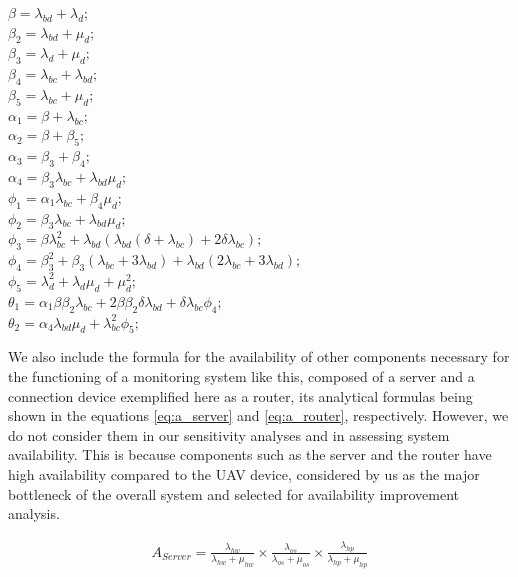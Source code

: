 \documentclass[conference]{IEEEtran}
\begin{document}
\begin{minipage}{.8\textwidth}%
\(\beta = \lambda_{bd} + \lambda_{d};\) \\
\(\beta_{2} = \lambda_{bd} + \mu_{d};\) \\
\(\beta_{3} = \lambda_{d} + \mu_{d};\) \\
\(\beta_{4} = \lambda_{bc} + \lambda_{bd};\) \\
\(\beta_{5} = \lambda_{bc} + \mu_{d};\) \\
\(\alpha_{1} = \beta + \lambda_{bc};\) \\
\(\alpha_{2} = \beta + \beta_{5};\) \\
\(\alpha_{3} = \beta_{3} + \beta_{4};\) \\
\(\alpha_{4} = \beta_{3}\lambda_{bc} + \lambda_{bd} \mu_{d};\) \\
\(\phi_{1} = \alpha_{1}\lambda_{bc} + \beta_{4} \mu_{d};\) \\
\(\phi_{2} = \beta_{3}\lambda_{bc} + \lambda_{bd} \mu_{d};\) \\
\(\phi_{3} = \beta \lambda_{bc}^{2} + \lambda_{bd} (\lambda_{bd} (\delta + \lambda_{bc}) + 2 \delta \lambda_{bc});\) \\
\(\phi_{4} = \beta_{3}^{2} + \beta_{3} (\lambda_{bc} + 3 \lambda_{bd}) + \lambda_{bd} (2 \lambda_{bc} + 3 \lambda_{bd});\) \\
\(\phi_{5} = \lambda_{d}^{2} + \lambda_{d} \mu_{d} + \mu_{d}^{2} ;\) \\
\(\theta_{1} = \alpha_{1} \beta  \beta_{2} \lambda_{bc} + 2 \beta  \beta_{2}  \delta \lambda_{bd}+ \delta  \lambda_{bc} \phi_{4};\) \\
\(\theta_{2} =  \alpha_{4} \lambda_{bd} \mu_{d} + \lambda_{bc}^{2} \phi_{5};\) \\
\end{minipage}%

We also include the formula for the availability of other components necessary for the functioning of a monitoring system like this, composed of a server and a connection device exemplified here as a router, its analytical formulas being shown in the equations \ref{eq:a_server} and \ref{eq:a_router}, respectively. However, we do not consider them in our sensitivity analyses and in assessing system availability. This is because components such as the server and the router have high availability compared to the UAV device, considered by us as the major bottleneck of the overall system and selected for availability improvement analysis.

\begin{align}
\label{eq:a_server}
A_{Server} = \frac{\lambda_{hw}}{\lambda_{hw} + \mu_{hw}} \times \frac{\lambda_{os}}{\lambda_{os} + \mu_{os}} \times
\frac{\lambda_{hp}}{\lambda_{hp} + \mu_{hp}} 
\end{align}
\end{document}
